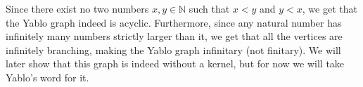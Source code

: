 Since there exist no two numbers $x,y \in \mathbb{N}$ such that $x < y$ and $y < x$, we get that the Yablo graph indeed is acyclic.
Furthermore, since any natural number has infinitely many numbers strictly larger than it, we get that all the vertices are infinitely branching, making the Yablo graph infinitary (not finitary).
We will later show that this graph is indeed without a kernel, but for now we will take Yablo's word \cite{analysis-yablo} for it.
